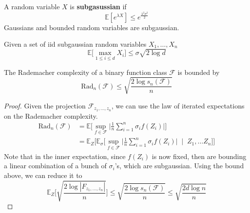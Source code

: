 \documentclass{article}
\begin{document}
  \begin{definition}
    A random variable $X$ is \textbf{subgasussian} if 
    \begin{equation}
      \mathbb{E}[e^{\lambda X}] \leq e^{\frac{\lambda^2 \sigma^2}{2}}
    \end{equation}
    Gaussians and bounded random variables are subgaussian.
  \end{definition}

  \begin{lemma}
    Given a set of iid subgaussian random variables $X_1, \ldots, X_n$ 
    \begin{equation}
      \mathbb{E}\big[ \max_{1 \leq i \leq d} X_i \big] \leq \sigma \sqrt{2 \log d}
    \end{equation}
  \end{lemma}

  \begin{theorem}
    The Rademacher complexity of a binary function class $\mathcal{F}$ is bounded by 
    \begin{equation}
      \mathrm{Rad}_n (\mathcal{F}) \leq \sqrt{\frac{2 \log s_n (\mathcal{F})}{n}}
    \end{equation}
  \end{theorem}
  \begin{proof}
    Given the projection $\mathcal{F}_{z_1, \ldots, z_n}$, we can use the law of iterated expectations on the Rademacher complexity. 
    \begin{align}
      \mathrm{Rad}_n (\mathcal{F}) & = \mathbb{E} \bigg[ \sup_{f \in \mathcal{F}} \bigg| \frac{1}{n} \sum_{i=1}^n \sigma_i f(Z_i) \bigg| \bigg] \\
                                   & = \mathbb{E}_{Z} \bigg[ \mathbb{E}_{\sigma} \bigg[ \sup_{f \in \mathcal{F}} \bigg| \frac{1}{n} \sum_{i=1}^n \sigma_i f(Z_i) \bigg| \; \mid \; Z_1, \ldots Z_n \bigg] \bigg] 
    \end{align}
    Note that in the inner expectation, since $f(Z_i)$ is now fixed, then are bounding a linear combination of a bunch of $\sigma_i$'s, which are subgaussian. Using the bound above, we can reduce it to 
    \begin{equation}
      \mathbb{E}_{Z} \bigg[ \sqrt{\frac{2 \log |F_{z_1, \ldots, z_n}|}{n}}\bigg] \leq \sqrt{\frac{2 \log s_n (\mathcal{F})}{n}} \leq \sqrt{\frac{2 d \log n}{n}} 
    \end{equation}
  \end{proof}
\end{document}
